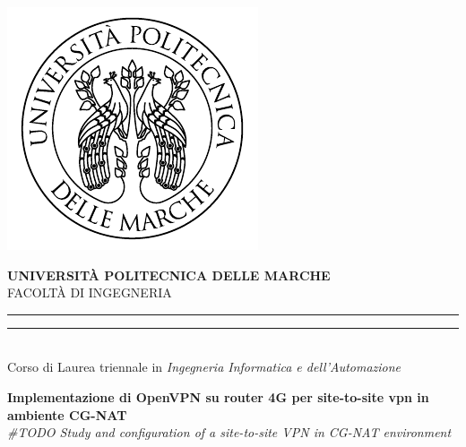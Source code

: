 \begin{titlepage}
    \begin{center}
        \includegraphics[scale=0.85]{immagini/UnivpmLogo.pdf} \\
        \vspace{5mm}

        {{\Large{\textbf{\large{UNIVERSITÀ POLITECNICA DELLE MARCHE}}}}} \\
        \vspace{3mm}
        \small{FACOLTÀ DI INGEGNERIA}
        \vspace{3.5mm}

        \rule[0.1cm]{17cm}{0.1mm}
        \rule[0.5cm]{17cm}{0.6mm}
        \\

        \large{{
                    Corso di Laurea triennale in \textit{Ingegneria Informatica e dell'Automazione}
                }}\\

    \end{center}

    \vspace{18mm}
    \begin{center}

        {
            \LARGE{
                \bf Implementazione di OpenVPN su router 4G per site-to-site vpn in ambiente CG-NAT
            }
        }\\

        \vspace{6mm}
        \Large{
            \textit{
                \#TODO Study and configuration of a site-to-site VPN in CG-NAT environment
            }
        }\\

        \vspace{15mm}
    \end{center}
    \vspace{20mm}


\end{titlepage}
